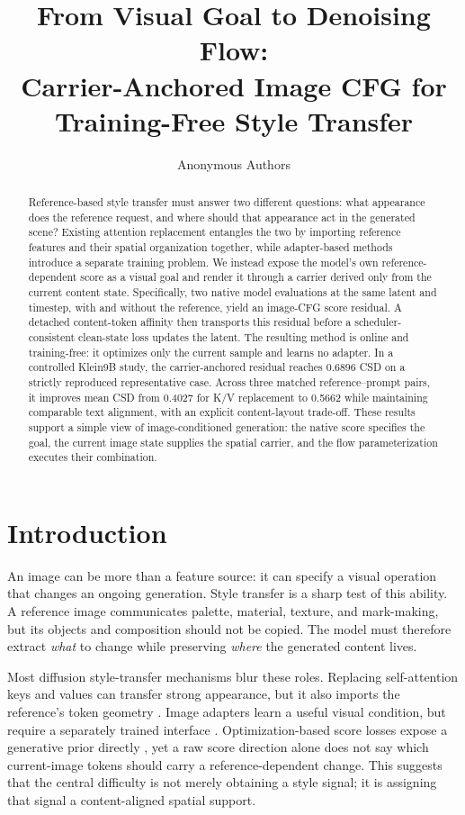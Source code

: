 \documentclass[10pt,letterpaper]{article}
\title{From Visual Goal to Denoising Flow:\\
Carrier-Anchored Image CFG for Training-Free Style Transfer}
\author{Anonymous Authors}
\date{}
\begin{document}
\maketitle

\begin{abstract}
Reference-based style transfer must answer two different questions: what
appearance does the reference request, and where should that appearance act in
the generated scene? Existing attention replacement entangles the two by
importing reference features and their spatial organization together, while
adapter-based methods introduce a separate training problem. We instead expose
the model's own reference-dependent score as a visual goal and render it through
a carrier derived only from the current content state. Specifically, two native
model evaluations at the same latent and timestep, with and without the
reference, yield an image-CFG score residual. A detached content-token affinity
then transports this residual before a scheduler-consistent clean-state loss
updates the latent. The resulting method is online and training-free: it
optimizes only the current sample and learns no adapter. In a controlled
Klein9B study, the carrier-anchored residual reaches 0.6896 CSD on a strictly
reproduced representative case. Across three matched reference--prompt pairs,
it improves mean CSD from 0.4027 for K/V replacement to 0.5662 while maintaining
comparable text alignment, with an explicit content-layout trade-off. These
results support a simple view of image-conditioned generation: the native score
specifies the goal, the current image state supplies the spatial carrier, and
the flow parameterization executes their combination.
\end{abstract}

\section{Introduction}

An image can be more than a feature source: it can specify a visual operation
that changes an ongoing generation. Style transfer is a sharp test of this
ability. A reference image communicates palette, material, texture, and
mark-making, but its objects and composition should not be copied. The model
must therefore extract \emph{what} to change while preserving \emph{where} the
generated content lives.

Most diffusion style-transfer mechanisms blur these roles. Replacing
self-attention keys and values can transfer strong appearance, but it also
imports the reference's token geometry \cite{chung2024styleinjection}. Image
adapters learn a useful visual condition, but require a separately trained
interface \cite{ye2023ipadapter}. Optimization-based score losses expose a
generative prior directly \cite{poole2023dreamfusion,hertz2023dds}, yet a raw
score direction alone does not say which current-image tokens should carry a
reference-dependent change. This suggests that the central difficulty is not
merely obtaining a style signal; it is assigning that signal a content-aligned
spatial support.
\end{document}
